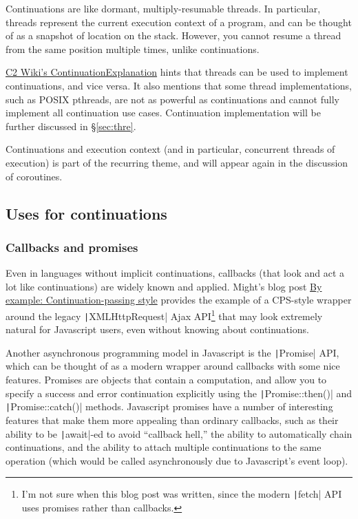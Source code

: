 \documentclass[]{article}
\begin{document}
Continuations are like dormant, multiply-resumable threads. In particular, threads represent the current execution context of a program, and can be thought of as a snapshot of location on the stack. However, you cannot resume a thread from the same position  multiple times, unlike continuations.

\href{https://wiki.c2.com/?ContinuationExplanation}{C2 Wiki's ContinuationExplanation} hints that threads can be used to implement continuations, and vice versa. It also mentions that some thread implementations, such as POSIX pthreads, are not as powerful as continuations and cannot fully implement all continuation use cases. Continuation implementation will be further discussed in \S{\ref{sec:thre}}.

Continuations and execution context (and in particular, concurrent threads of execution) is part of the recurring theme, and will appear again in the discussion of coroutines.

\subsection{Uses for continuations}
\label{sec:uses}

\subsubsection{Callbacks and promises}
\label{sec:cacb}

Even in languages without implicit continuations, callbacks (that look and act a lot like continuations) are widely known and applied. Might's blog post \href{https://matt.might.net/articles/by-example-continuation-passing-style/}{By example: Continuation-passing style} provides the example of a CPS-style wrapper around the legacy \texttt|XMLHttpRequest| Ajax API\footnote{I'm not sure when this blog post was written, since the modern \texttt|fetch| API uses promises rather than callbacks.} that may look extremely natural for Javascript users, even without knowing about continuations.

Another asynchronous programming model in Javascript is the \texttt|Promise| API, which can be thought of as a modern wrapper around callbacks with some nice features. Promises are objects that contain a computation, and allow you to specify a success and error continuation explicitly using the \texttt|Promise::then()| and \texttt|Promise::catch()| methods. Javascript promises have a number of interesting features that make them more appealing than ordinary callbacks, such as their ability to be \texttt|await|-ed to avoid ``callback hell,'' the ability to automatically chain continuations, and the ability to attach multiple continuations to the same operation (which would be called asynchronously due to Javascript's event loop).
\end{document}
